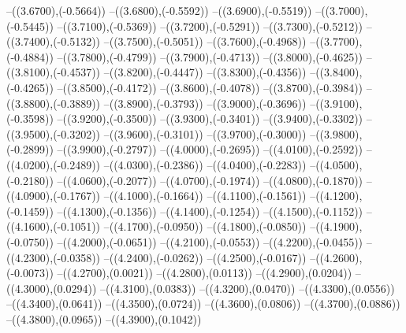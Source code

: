{	--({\sx*(3.6700)},{\sy*(-0.5664)})
	--({\sx*(3.6800)},{\sy*(-0.5592)})
	--({\sx*(3.6900)},{\sy*(-0.5519)})
	--({\sx*(3.7000)},{\sy*(-0.5445)})
	--({\sx*(3.7100)},{\sy*(-0.5369)})
	--({\sx*(3.7200)},{\sy*(-0.5291)})
	--({\sx*(3.7300)},{\sy*(-0.5212)})
	--({\sx*(3.7400)},{\sy*(-0.5132)})
	--({\sx*(3.7500)},{\sy*(-0.5051)})
	--({\sx*(3.7600)},{\sy*(-0.4968)})
	--({\sx*(3.7700)},{\sy*(-0.4884)})
	--({\sx*(3.7800)},{\sy*(-0.4799)})
	--({\sx*(3.7900)},{\sy*(-0.4713)})
	--({\sx*(3.8000)},{\sy*(-0.4625)})
	--({\sx*(3.8100)},{\sy*(-0.4537)})
	--({\sx*(3.8200)},{\sy*(-0.4447)})
	--({\sx*(3.8300)},{\sy*(-0.4356)})
	--({\sx*(3.8400)},{\sy*(-0.4265)})
	--({\sx*(3.8500)},{\sy*(-0.4172)})
	--({\sx*(3.8600)},{\sy*(-0.4078)})
	--({\sx*(3.8700)},{\sy*(-0.3984)})
	--({\sx*(3.8800)},{\sy*(-0.3889)})
	--({\sx*(3.8900)},{\sy*(-0.3793)})
	--({\sx*(3.9000)},{\sy*(-0.3696)})
	--({\sx*(3.9100)},{\sy*(-0.3598)})
	--({\sx*(3.9200)},{\sy*(-0.3500)})
	--({\sx*(3.9300)},{\sy*(-0.3401)})
	--({\sx*(3.9400)},{\sy*(-0.3302)})
	--({\sx*(3.9500)},{\sy*(-0.3202)})
	--({\sx*(3.9600)},{\sy*(-0.3101)})
	--({\sx*(3.9700)},{\sy*(-0.3000)})
	--({\sx*(3.9800)},{\sy*(-0.2899)})
	--({\sx*(3.9900)},{\sy*(-0.2797)})
	--({\sx*(4.0000)},{\sy*(-0.2695)})
	--({\sx*(4.0100)},{\sy*(-0.2592)})
	--({\sx*(4.0200)},{\sy*(-0.2489)})
	--({\sx*(4.0300)},{\sy*(-0.2386)})
	--({\sx*(4.0400)},{\sy*(-0.2283)})
	--({\sx*(4.0500)},{\sy*(-0.2180)})
	--({\sx*(4.0600)},{\sy*(-0.2077)})
	--({\sx*(4.0700)},{\sy*(-0.1974)})
	--({\sx*(4.0800)},{\sy*(-0.1870)})
	--({\sx*(4.0900)},{\sy*(-0.1767)})
	--({\sx*(4.1000)},{\sy*(-0.1664)})
	--({\sx*(4.1100)},{\sy*(-0.1561)})
	--({\sx*(4.1200)},{\sy*(-0.1459)})
	--({\sx*(4.1300)},{\sy*(-0.1356)})
	--({\sx*(4.1400)},{\sy*(-0.1254)})
	--({\sx*(4.1500)},{\sy*(-0.1152)})
	--({\sx*(4.1600)},{\sy*(-0.1051)})
	--({\sx*(4.1700)},{\sy*(-0.0950)})
	--({\sx*(4.1800)},{\sy*(-0.0850)})
	--({\sx*(4.1900)},{\sy*(-0.0750)})
	--({\sx*(4.2000)},{\sy*(-0.0651)})
	--({\sx*(4.2100)},{\sy*(-0.0553)})
	--({\sx*(4.2200)},{\sy*(-0.0455)})
	--({\sx*(4.2300)},{\sy*(-0.0358)})
	--({\sx*(4.2400)},{\sy*(-0.0262)})
	--({\sx*(4.2500)},{\sy*(-0.0167)})
	--({\sx*(4.2600)},{\sy*(-0.0073)})
	--({\sx*(4.2700)},{\sy*(0.0021)})
	--({\sx*(4.2800)},{\sy*(0.0113)})
	--({\sx*(4.2900)},{\sy*(0.0204)})
	--({\sx*(4.3000)},{\sy*(0.0294)})
	--({\sx*(4.3100)},{\sy*(0.0383)})
	--({\sx*(4.3200)},{\sy*(0.0470)})
	--({\sx*(4.3300)},{\sy*(0.0556)})
	--({\sx*(4.3400)},{\sy*(0.0641)})
	--({\sx*(4.3500)},{\sy*(0.0724)})
	--({\sx*(4.3600)},{\sy*(0.0806)})
	--({\sx*(4.3700)},{\sy*(0.0886)})
	--({\sx*(4.3800)},{\sy*(0.0965)})
	--({\sx*(4.3900)},{\sy*(0.1042)})
}

